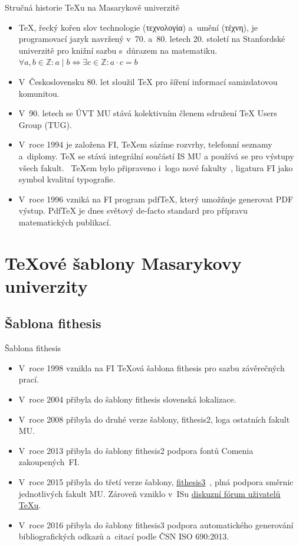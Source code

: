 \documentclass[
  aspectratio=169,
]{beamer}
\makeatletter
\newcommand\odkaz[2]{\textcolor{mubeamer@base}{\uline{\href{#1}{#2}}}}
\makeatother
\begin{document}
\begin{frame}{Stručná historie \TeX u na Masarykově univerzitě}
\begin{itemize}
\item \TeX{}, řecký kořen slov \alert{technologie} (\textgreek{τεχνολογία}) a~\alert{umění} (\textgreek{τέχνη}), je \alert{programovací jazyk} navržený v~70. a~80. letech 20. století na Stanfordské univerzitě \alert{pro knižní sazbu s~důrazem na matematiku}. $\forall a,b\in\mathbb{Z}: a\mid b\iff\exists c\in\mathbb{Z}:a\cdot c=b$
\item V~Československu 80. let sloužil \TeX{} pro šíření informací samizdatovou komunitou.
\item V~90. letech se ÚVT MU stává kolektivním členem sdružení \TeX{} Users Group (TUG).
\item V~roce 1994 je založena FI, \alert{\TeX em sázíme rozvrhy, telefonní seznamy a~diplomy}. \TeX{} se stává \alert{integrální součástí IS MU} a používá se pro výstupy všech fakult.~\cite{sojkanovotny17} \TeX em bylo připraveno i~logo nové fakulty~\cite{zlatuska95}, ligatura FI jako symbol kvalitní typografie. 
\item V~roce 1996 vzniká na FI program pdf\TeX{}, který umožňuje generovat PDF výstup. Pdf\TeX{} je dnes \alert{světový de-facto standard pro přípravu matematických publikací}.
\end{itemize}
\end{frame}

\section[\TeX ové šablony MU]{\TeX ové šablony Masarykovy univerzity}
\subsection{Šablona fithesis}

\begin{frame}{Šablona fithesis}
\begin{itemize}
\item V~roce 1998 vznikla na FI \TeX ová \alert{šablona fithesis pro sazbu závěrečných prací}.
\item V~roce 2004 přibyla do šablony fithesis slovenská lokalizace.
\item V~roce 2008 přibyla do druhé verze šablony, \alert{fithesis2, loga ostatních fakult MU}.
\item V~roce 2013 přibyla do šablony fithesis2 podpora fontů Comenia zakoupených~FI.
\item V~roce 2015 přibyla do třetí verze šablony, \alert{\odkaz{https://www.fi.muni.cz/lemma/projekty/fithesis3}{fithesis3}~\cite{novotny15}, plná podpora směrnic jednotlivých fakult MU}. Zároveň vzniklo v~ISu \odkaz{https://is.muni.cz/auth/df/fithesis-sazba/}{diskuzní fórum uživatelů \TeX u}.
\item V~roce 2016 přibyla do šablony fithesis3 podpora automatického generování bibliografických odkazů a~citací podle ČSN ISO 690:2013.
\end{itemize}
\end{frame}
\end{document}
